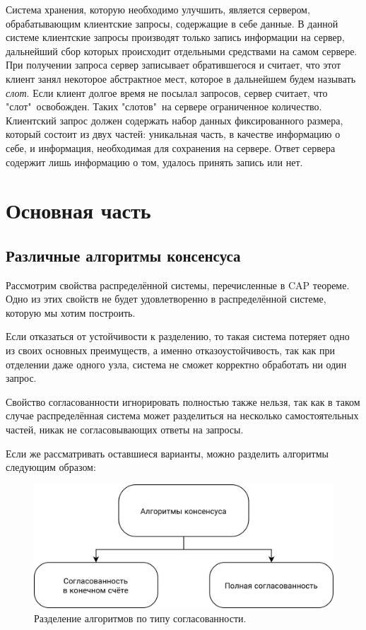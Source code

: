 \documentclass[subf, href, colorlinks=true, 14pt,
times, mtpro, specialist]{disser}
\theoremstyle{definition}
\begin{document}
Система хранения, которую необходимо улучшить, является сервером, обрабатывающим клиентские запросы, содержащие в себе данные. В данной системе клиентские запросы производят только запись информации на сервер, дальнейший сбор которых происходит отдельными средствами на самом сервере. При получении запроса сервер записывает обратившегося и считает, что этот клиент занял некоторое абстрактное мест, которое в дальнейшем будем называть \emph{слот}. Если клиент долгое время не посылал запросов, сервер считает, что "слот"\ освобожден. Таких "слотов"\ на сервере ограниченное количество.
Клиентский запрос должен содержать набор данных фиксированного размера, который состоит из двух частей: уникальная часть, в качестве информацию о себе, и информация, необходимая для сохранения на сервере. Ответ сервера содержит лишь информацию о том, удалось принять запись или нет.

\newpage
\section{Основная часть}

\subsection{Различные алгоритмы консенсуса}

Рассмотрим свойства распределённой системы, перечисленные в CAP теореме. Одно из этих свойств не будет удовлетворенно в распределённой системе, которую мы хотим построить. 

Если отказаться от устойчивости к разделению, то такая система потеряет одно из своих основных преимуществ, а именно отказоустойчивость, так как при отделении даже одного узла, система не сможет корректно обработать ни один запрос.

Свойство согласованности игнорировать полностью также нельзя, так как в таком случае распределённая система может разделиться на несколько самостоятельных частей, никак не согласовывающих ответы на запросы. 

Если же рассматривать оставшиеся варианты, можно разделить алгоритмы следующим образом:

\begin{figure}[H]
\centering
\includegraphics[width=1\textwidth]{src/pics/consensus_types_1.png}
\caption{Разделение алгоритмов по типу согласованности.}
\label{fig:consensus_types_1}
\end{figure}
\end{document}
